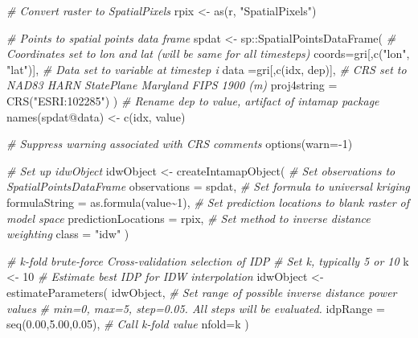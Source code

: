 \documentclass[
]{article}
\newenvironment{Shaded}{\begin{snugshade}}{\end{snugshade}}
\newcommand{\AttributeTok}[1]{\textcolor[rgb]{0.77,0.63,0.00}{#1}}
\newcommand{\CommentTok}[1]{\textcolor[rgb]{0.56,0.35,0.01}{\textit{#1}}}
\newcommand{\DecValTok}[1]{\textcolor[rgb]{0.00,0.00,0.81}{#1}}
\newcommand{\FloatTok}[1]{\textcolor[rgb]{0.00,0.00,0.81}{#1}}
\newcommand{\FunctionTok}[1]{\textcolor[rgb]{0.00,0.00,0.00}{#1}}
\newcommand{\NormalTok}[1]{#1}
\newcommand{\OtherTok}[1]{\textcolor[rgb]{0.56,0.35,0.01}{#1}}
\newcommand{\SpecialCharTok}[1]{\textcolor[rgb]{0.00,0.00,0.00}{#1}}
\newcommand{\StringTok}[1]{\textcolor[rgb]{0.31,0.60,0.02}{#1}}
\begin{document}
\begin{Shaded}
\begin{Highlighting}[]
\CommentTok{\# Convert raster to SpatialPixels}
\NormalTok{rpix }\OtherTok{\textless{}{-}} \FunctionTok{as}\NormalTok{(r, }\StringTok{"SpatialPixels"}\NormalTok{)}

\CommentTok{\# Points to spatial points data frame}
\NormalTok{spdat }\OtherTok{\textless{}{-}}\NormalTok{ sp}\SpecialCharTok{::}\FunctionTok{SpatialPointsDataFrame}\NormalTok{(}
  \CommentTok{\# Coordinates set to lon and lat (will be same for all timesteps)}
  \AttributeTok{coords=}\NormalTok{gri[,}\FunctionTok{c}\NormalTok{(}\StringTok{"lon"}\NormalTok{, }\StringTok{"lat"}\NormalTok{)],}
  \CommentTok{\# Data set to variable at timestep i}
  \AttributeTok{data  =}\NormalTok{gri[,}\FunctionTok{c}\NormalTok{(}\StringTok{\textquotesingle{}idx\textquotesingle{}}\NormalTok{, }\StringTok{\textquotesingle{}dep\textquotesingle{}}\NormalTok{)],}
  \CommentTok{\# CRS set to NAD83 HARN StatePlane Maryland FIPS 1900 (m)}
  \AttributeTok{proj4string =} \FunctionTok{CRS}\NormalTok{(}\StringTok{"ESRI:102285"}\NormalTok{)}
\NormalTok{)}
\CommentTok{\# Rename dep to value, artifact of intamap package}
\FunctionTok{names}\NormalTok{(spdat}\SpecialCharTok{@}\NormalTok{data) }\OtherTok{\textless{}{-}} \FunctionTok{c}\NormalTok{(}\StringTok{\textquotesingle{}idx\textquotesingle{}}\NormalTok{, }\StringTok{\textquotesingle{}value\textquotesingle{}}\NormalTok{)}

\CommentTok{\# Suppress warning associated with CRS comments}
\FunctionTok{options}\NormalTok{(}\AttributeTok{warn=}\SpecialCharTok{{-}}\DecValTok{1}\NormalTok{)}

\CommentTok{\# Set up idwObject}
\NormalTok{idwObject }\OtherTok{\textless{}{-}}  \FunctionTok{createIntamapObject}\NormalTok{(}
  \CommentTok{\# Set observations to SpatialPointsDataFrame}
  \AttributeTok{observations        =}\NormalTok{ spdat,}
  \CommentTok{\# Set formula to universal kriging}
  \AttributeTok{formulaString       =} \FunctionTok{as.formula}\NormalTok{(value}\SpecialCharTok{\textasciitilde{}}\DecValTok{1}\NormalTok{),}
  \CommentTok{\# Set prediction locations to blank raster of model space}
  \AttributeTok{predictionLocations =}\NormalTok{ rpix,}
  \CommentTok{\# Set method to inverse distance weighting}
  \AttributeTok{class               =} \StringTok{"idw"}
\NormalTok{)}

\CommentTok{\# k{-}fold brute{-}force Cross{-}validation selection of IDP}
\CommentTok{\# Set k, typically 5 or 10}
\NormalTok{k }\OtherTok{\textless{}{-}} \DecValTok{10}
\CommentTok{\# Estimate best IDP for IDW interpolation}
\NormalTok{idwObject }\OtherTok{\textless{}{-}}  \FunctionTok{estimateParameters}\NormalTok{(}
\NormalTok{  idwObject,}
\CommentTok{\# Set range of possible inverse distance power values}
\CommentTok{\# min=0, max=5, step=0.05. All steps will be evaluated.}
  \AttributeTok{idpRange =} \FunctionTok{seq}\NormalTok{(}\FloatTok{0.00}\NormalTok{,}\FloatTok{5.00}\NormalTok{,}\FloatTok{0.05}\NormalTok{),}
\CommentTok{\# Call k{-}fold value}
  \AttributeTok{nfold=}\NormalTok{k}
\NormalTok{)}


\end{Highlighting}
\end{Shaded}
\end{document}
